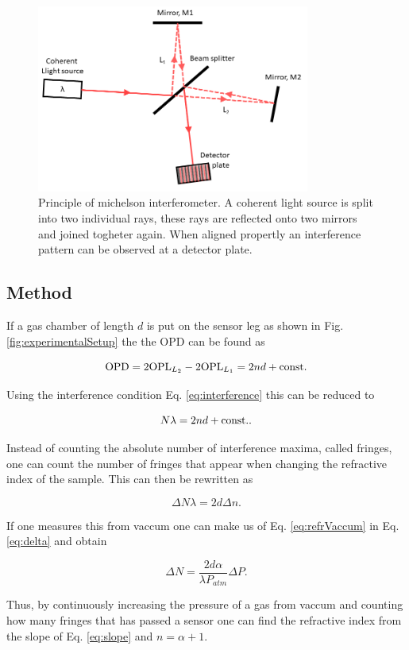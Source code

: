 \begin{figure}[H]
  \centering
  \includegraphics[width=0.8\textwidth]{Method.png}
  \caption{Principle of michelson interferometer. A coherent light source is split into two individual rays, these rays are reflected onto two mirrors and joined togheter again. When aligned propertly an interference pattern can be observed at a detector plate.}
  \label{fig:michelsonInterferometer}
\end{figure}

\subsection{Method}

If a gas chamber of length $d$ is put on the sensor leg as shown in Fig. \ref{fig:experimentalSetup} the the OPD can be found as

\begin{equation}
  \label{eq:OPD}
  \textnormal{OPD} = 2\textnormal{OPL}_{L_2} - 2\textnormal{OPL}_{L_1} = 2nd + \textnormal{const.}
\end{equation}

Using the interference condition Eq. \eqref{eq:interference} this can be reduced to

\begin{equation*}
  N \lambda = 2nd + \textnormal{const.}.
\end{equation*}

Instead of counting the absolute number of interference maxima, called fringes, one can count the number of fringes that appear when changing the refractive index of the sample. This can then be rewritten as

\begin{equation}
\label{eq:delta}
  \Delta N \lambda = 2d \Delta n.
\end{equation}

If one measures this from vaccum one can make us of Eq. \eqref{eq:refrVaccum} in Eq. \eqref{eq:delta} and obtain

\begin{equation}
\label{eq:slope}
  \Delta N = \frac{2d\alpha}{\lambda P_{atm}} \Delta P.
\end{equation}

Thus, by continuously increasing the pressure of a gas from vaccum and counting how many fringes that has passed a sensor one can find the refractive index from the slope of Eq. \eqref{eq:slope} and $n=\alpha+1$.
